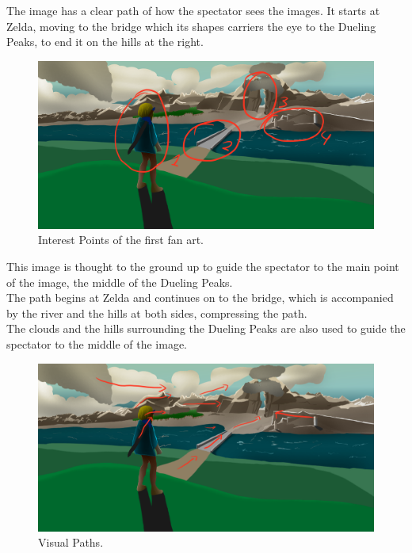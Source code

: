 \documentclass{cup-pan}
\begin{document}
            The image has a clear path of how the spectator sees the images. It starts at Zelda, moving to the bridge which its shapes carriers the eye to the Dueling Peaks, to end it on the hills at the right.\\
            \begin{figure}[H]
                \includegraphics[width=\textwidth]{Imagenes/Fanart1/Analysis/puntosinteres.png}
                \caption{Interest Points of the first fan art.}
            \end{figure}

            This image is thought to the ground up to guide the spectator to the main point of the image, the middle of the Dueling Peaks.\\
            The path begins at Zelda and continues on to the bridge, which is accompanied by the river and the hills at both sides, compressing the path.\\
            The clouds and the hills surrounding the Dueling Peaks are also used to guide the spectator to the middle of the image.\\
            \begin{figure}[H]
                \includegraphics[width=\textwidth]{Imagenes/Fanart1/Analysis/recorridovisual.png}
                \caption{Visual Paths.}
            \end{figure}
\end{document}

